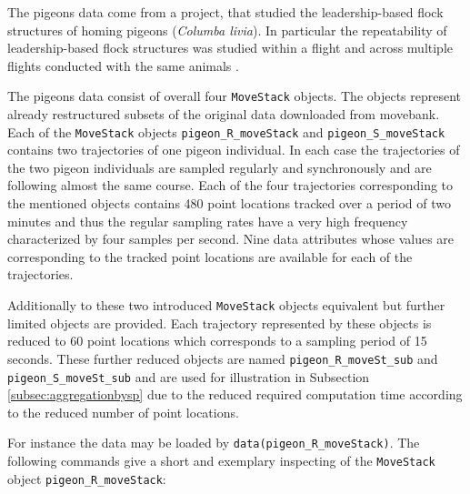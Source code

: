 \documentclass[12pt, oneside, a4paper]{scrbook}
\let\code=\texttt
\begin{document}


The pigeons data come from a project, that studied the leadership-based flock structures of homing
pigeons (\textit{Columba livia}). In particular the repeatability of leadership-based flock structures was studied within a flight and across multiple flights conducted with the same animals \citep{santos2014data, santos_temporal_2014}.
\par\medskip

The pigeons data consist of overall four \code{MoveStack} objects. The objects represent already restructured subsets of the original data downloaded from movebank. Each of the \code{MoveStack} objects \code{pigeon\_R\_moveStack} and \code{pigeon\_S\_moveStack} contains two trajectories of one pigeon individual. In each case the trajectories of the two pigeon individuals are sampled regularly and synchronously and are following almost the same course. Each of the four trajectories corresponding to the mentioned objects contains 480 point locations tracked over a period of two minutes and thus the regular sampling rates have a very high frequency characterized by four samples per second. Nine data attributes whose values are corresponding to the tracked point locations are available for each of the trajectories.
\par\medskip

Additionally to these two introduced \code{MoveStack} objects equivalent but further limited objects are provided. Each trajectory represented by these objects is reduced to 60 point locations which corresponds to a sampling period of 15 seconds. These further reduced objects are named \code{pigeon\_R\_moveSt\_sub} and \code{pigeon\_S\_moveSt\_sub} and are used for illustration in Subsection \ref{subsec:aggregationbysp} due to the reduced required computation time according to the reduced number of point locations.
\par\medskip

For instance the data may be loaded by \code{data(pigeon\_R\_moveStack)}. The following commands give a short and exemplary inspecting of the \code{MoveStack} object \code{pigeon\_R\_moveStack}:
\par\medskip
\end{document}
